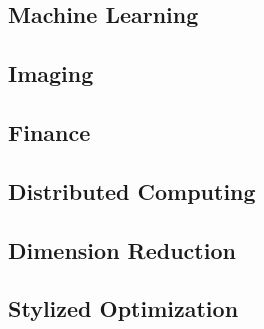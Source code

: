\documentclass[amsa]{ipart}
\begin{document}
\newpage

%





%






%



\subsection{Machine Learning}






\subsection{Imaging}





\subsection{Finance}



\subsection{Distributed Computing}



\subsection{Dimension Reduction}



\subsection{Stylized Optimization}










\appendix

\end{document}
